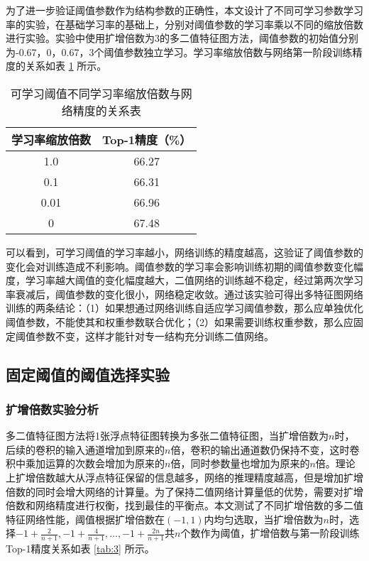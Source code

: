 为了进一步验证阈值参数作为结构参数的正确性，本文设计了不同可学习参数学习率的实验，在基础学习率的基础上，分别对阈值参数的学习率乘以不同的缩放倍数进行实验。实验中使用扩增倍数为3的多二值特征图方法，阈值参数的初始值分别为-0.67，0，0.67，3个阈值参数独立学习。学习率缩放倍数与网络第一阶段训练精度的关系如表 \ref{tab:2} 所示。

\begin{table}[htb]
  \vspace{6pt}
  \centering
  \caption{可学习阈值不同学习率缩放倍数与网络精度的关系表}
  \label{tab:2}
  \begin{tabular}{cc}
    \toprule
    学习率缩放倍数   & Top-1精度（\%）    \\
    \midrule
    1.0 & 66.27 \\
    0.1 & 66.31 \\
    0.01 & 66.96   \\
    0   & 67.48       \\
    \bottomrule
  \end{tabular}
  \vspace{6pt}
\end{table}

可以看到，可学习阈值的学习率越小，网络训练的精度越高，这验证了阈值参数的变化会对训练造成不利影响。阈值参数的学习率会影响训练初期的阈值参数变化幅度，学习率越大阈值的变化幅度越大，二值网络的训练越不稳定，经过第两次学习率衰减后，阈值参数的变化很小，网络稳定收敛。通过该实验可得出多特征图网络训练的两条结论：（1）如果想通过网络训练自适应学习阈值参数，那么应单独优化阈值参数，不能使其和权重参数联合优化；（2）如果需要训练权重参数，那么应固定阈值参数不变，这样才能针对专一结构充分训练二值网络。

\subsection{固定阈值的阈值选择实验}

\subsubsection{扩增倍数实验分析}

多二值特征图方法将1张浮点特征图转换为多张二值特征图，当扩增倍数为$n$时，后续的卷积的输入通道增加到原来的$n$倍，卷积的输出通道数仍保持不变，这时卷积中乘加运算的次数会增加为原来的$n$倍，同时参数量也增加为原来的$n$倍。理论上扩增倍数越大从浮点特征保留的信息越多，网络的推理精度越高，但是增加扩增倍数的同时会增大网络的计算量。为了保持二值网络计算量低的优势，需要对扩增倍数和网络精度进行权衡，找到最佳的平衡点。本文测试了不同扩增倍数的多二值特征网络性能，阈值根据扩增倍数在$(-1, 1)$内均匀选取，当扩增倍数为$n$时，选择$-1 + \frac{2}{n+1}, -1 + \frac{4}{n+1}, \dots, -1 + \frac{2n}{n+1} $共$n$个数作为阈值，扩增倍数与第一阶段训练Top-1精度关系如表 \ref{tab:3} 所示。

